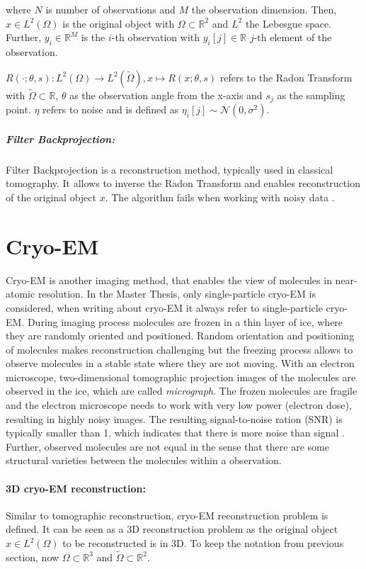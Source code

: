where $N$ is number of observations and $M$ the observation dimension.
Then, $x \in L^2(\Omega)$ is the original object with $\Omega \subset \mathbb{R}^2 $ and $L^2$ the Lebesgue space.
Further, $y_i \in \mathbb{R}^M$ is the $i$-th observation with $y_i[j] \in \mathbb{R}$ $j$-th element of the observation.

$R(\cdot; \theta, s): L^2(\Omega) \to L^2(\tilde{\Omega}) , x \mapsto R(x; \theta,s)$ refers to the Radon Transform
with $\tilde{\Omega} \subset \mathbb{R}$, $\theta$ as the observation angle from the x-axis and $s_j$ as the sampling point.
$\eta$ refers to noise and is defined as $\eta_i[j] \sim \mathcal{N}(0,\sigma^2)$.

\subparagraph{Filter Backprojection:}
Filter Backprojection \cite{tomographicReconstruction} is a reconstruction method, typically used in classical tomography.
It allows to inverse the Radon Transform and enables reconstruction of the original object $x$. 
The algorithm fails when working with noisy data \cite{cryoEmMath2}.

\section{Cryo-EM}
Cryo-EM is another imaging method, that enables the view of molecules in near-atomic resolution.
In the Master Thesis, only single-particle cryo-EM\cite{singleParticleCryoEm} is considered, when writing about cryo-EM it always refer to single-particle cryo-EM.
During imaging process molecules are frozen in a thin layer of ice, where they are randomly oriented and positioned. 
Random orientation and positioning of molecules makes reconstruction challenging but
the freezing process allows to observe molecules in a stable state where they are not moving.
With an electron microscope, two-dimensional tomographic projection images of the molecules are observed in the ice,
which are called \textit{micrograph}. The frozen molecules are fragile and the electron microscope needs to work with
very low power (electron dose), resulting in highly noisy images. The resulting signal-to-noise ration (SNR)
is typically smaller than 1, which indicates that there is more noise than signal \cite{cryoEmMath2}.
Further, observed molecules are not equal in the sense that there are some structural varieties between
the molecules within a observation.


\paragraph{3D cryo-EM reconstruction:}
Similar to tomographic reconstruction, cryo-EM reconstruction problem \cite{cryoEmMath} is defined.
It can be seen as a 3D reconstruction problem as the original object $x \in L^2(\Omega)$ to be reconstructed is in 3D.
To keep the notation from previous section, now $\Omega \subset \mathbb{R}^3 $ and $\tilde{\Omega} \subset \mathbb{R}^2 $.


